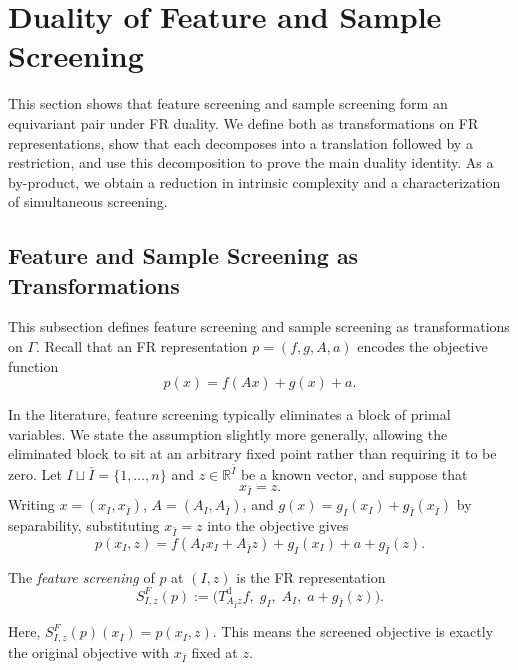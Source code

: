 \section{Duality of Feature and Sample Screening}
\label{sec:screening}

This section shows that feature screening and sample screening form an
equivariant pair under FR duality. We define both as transformations on
FR representations, show that each decomposes into a translation
followed by a restriction, and use this decomposition to prove the
main duality identity. As a by-product, we obtain a reduction in
intrinsic complexity and a characterization of simultaneous screening.


\subsection{Feature and Sample Screening as Transformations}

This subsection defines feature screening and sample screening as
transformations on \(\Gamma\). Recall that an FR
representation \(p=(f,g,A,a)\) encodes the objective function
\[
p(x)=f(Ax)+g(x)+a.
\]

In the literature, feature screening typically eliminates a block of primal variables. We state the
assumption slightly more generally, allowing the eliminated block to
sit at an arbitrary fixed point rather than requiring it to be zero.
Let \(I\sqcup\bar I=\{1,\ldots,n\}\) and \(z\in\mathbb R^{\bar I}\) be a known vector, and
suppose that
\[
x_{\bar I}=z.
\]
Writing \(x=(x_I,x_{\bar I})\), \(A=(A_I,A_{\bar I})\), and
\(g(x)=g_I(x_I)+g_{\bar I}(x_{\bar I})\) by separability, substituting
\(x_{\bar I}=z\) into the objective gives
\[
p(x_I,z)
=
f(A_Ix_I+A_{\bar I}z)+g_I(x_I)+a+g_{\bar I}(z).
\]

\begin{definition}
The \emph{feature screening} of \(p\) at \((I,z)\) is the FR
representation
\[
S^{F}_{I,z}(p)
:=
\bigl(
T^{\mathrm d}_{A_{\bar I}z}f,\;
g_I,\;
A_I,\;
a+g_{\bar I}(z)
\bigr).
\]
\end{definition}

Here, \(S^F_{I,z}(p)(x_I)=p(x_I,z)\). This means the screened objective is exactly the original objective with \(x_{\bar I}\) fixed at \(z\).

